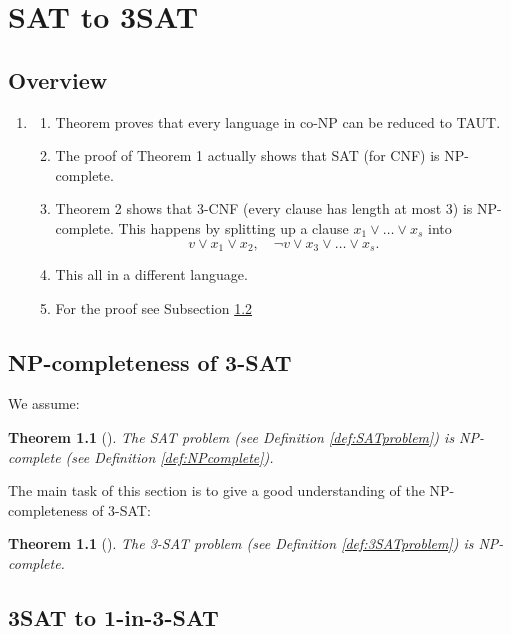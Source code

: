 \documentclass[a4paper]{report}
\newtheorem{thm}[defi]{Theorem}
\begin{document}
\chapter{SAT to 3SAT}
\label{cha:sat13}


\section{Overview}
\label{sec:sat13Overview}

\begin{enumerate}
\item \cite{Cook1971NP}
  \begin{enumerate}
  \item Theorem proves that every language in co-NP can be reduced to TAUT.
  \item The proof of Theorem 1 actually shows that SAT (for CNF) is NP-complete.
  \item Theorem 2 shows that 3-CNF (every clause has length at most 3) is NP-complete. This happens by splitting up a clause $x_1 \vee \dots \vee x_s$ into
    \begin{displaymath}
      v \vee x_1 \vee x_2, \quad \neg v \vee x_3 \vee \dots \vee x_s.
    \end{displaymath}
  \item This all in a different language.
  \item For the proof see Subsection \ref{sec:3SATNPcomp}
  \end{enumerate}
\end{enumerate}



\section{NP-completeness of 3-SAT}
\label{sec:3SATNPcomp}

We assume:
\begin{thm}[{{\cite[Theorem 1]{Cook1971NP}}}]\label{thm:SATNPcomplete}
  The SAT problem (see Definition \ref{def:SATproblem}) is NP-complete (see Definition \ref{def:NPcomplete}).
\end{thm}

The main task of this section is to give a good understanding of the NP-completeness of 3-SAT:
\begin{thm}[{{\cite[Theorem 2]{Cook1971NP}}}]\label{thm:SATNPcomplete}
  The 3-SAT problem (see Definition \ref{def:3SATproblem}) is NP-complete.
\end{thm}





\section{3SAT to 1-in-3-SAT}
\label{sec:3satto13}





\end{document}
